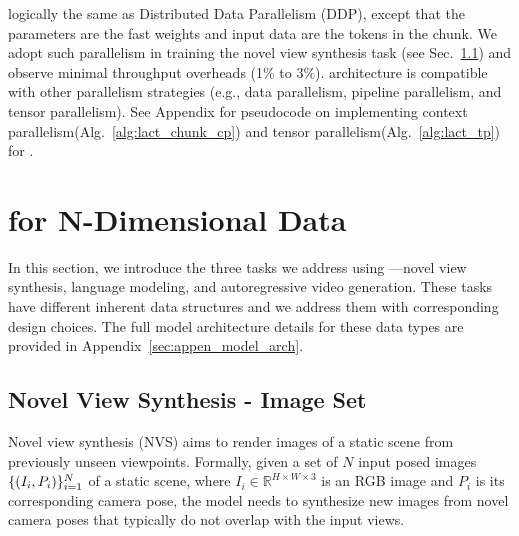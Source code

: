logically the same as Distributed Data Parallelism (DDP), except that the parameters are the fast weights and input data are the tokens in the chunk.
We adopt such parallelism in training the novel view synthesis task (see Sec.~\ref{sec:method-nvs}) 
and observe minimal throughput overheads (1\% to 3\%).
\methodname{} architecture is compatible with other parallelism strategies (e.g., data parallelism, pipeline parallelism, and tensor parallelism). See Appendix for pseudocode on implementing context parallelism(Alg.~\ref{alg:lact_chunk_cp}) and tensor parallelism(Alg.~\ref{alg:lact_tp}) for \methodname{}.

\section{\methodname{} for N-Dimensional Data} \label{sec:method}

In this section, we introduce the three tasks we address using \methodname{}---novel view synthesis, language modeling, and autoregressive video generation.
These tasks have different inherent data structures and we address them with corresponding design choices.
The full model architecture details for these data types are provided in Appendix~\ref{sec:appen_model_arch}.

\subsection{Novel View Synthesis - Image Set}
\label{sec:method-nvs}
Novel view synthesis (NVS)\cite{mcmillan2023plenoptic, levoy2023light} aims to render images of a static scene from previously unseen viewpoints. Formally, 
given a set of $N$ input posed images $\{ (  I_i, P_i ) \}_{i=1}^N$ of a static scene, 
where $I_i \in \mathbb{R}^{H\times W \times 3}$ is an RGB image and $P_i$ is its corresponding camera pose,
the model needs to synthesize new images from novel camera poses that typically do not overlap with the input views. 


